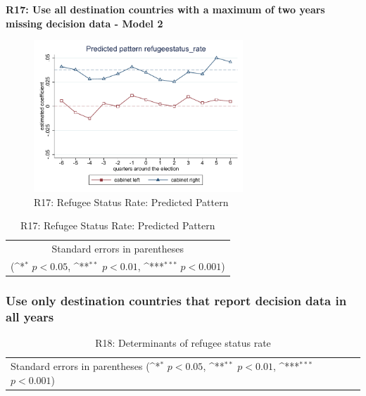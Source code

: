 \documentclass[10pt,a4paper]{scrartcl}
\begin{document}
\clearpage
\textbf{R17: Use all destination countries with a maximum of two years missing decision data - Model 2}
\begin{figure}[!ht]
	\centering
	\includegraphics[width=0.7\textwidth]{figures_edited/refugeestatus_rate_graph2_R17.pdf}
	\caption{R17: Refugee Status Rate: Predicted Pattern}
\end{figure}

\begin{table}[!ht]\centering
	\footnotesize
	\renewcommand{\arraystretch}{1.15}
	\def\sym#1{\ifmmode^{#1}\else\(^{#1}\)\fi}
	\caption{R17: Refugee Status Rate: Predicted Pattern}
	\begin{tabular}{l*{2}{c}}
		\hline\hline
		
		\hline\hline
		\multicolumn{3}{c}{\footnotesize Standard errors in parentheses} \\
		\multicolumn{3}{c}{\footnotesize (\sym{*} \(p<0.05\), \sym{**} \(p<0.01\), \sym{***} \(p<0.001\))} \\
	\end{tabular}
\end{table}





\clearpage
\FloatBarrier
\subsubsection{Use only destination countries that report decision data in all years}
\begin{table}[!ht]\centering
	\renewcommand{\arraystretch}{1.25}
	\small
	\def\sym#1{\ifmmode^{#1}\else\(^{#1}\)\fi}
	\caption{R18: Determinants of refugee status rate}
	\begin{tabular}{l*{3}{c}}
		\hline\hline
		
		\hline\hline
		\multicolumn{4}{l}{\footnotesize Standard errors in parentheses (\sym{*} \(p<0.05\), \sym{**} \(p<0.01\), \sym{***} \(p<0.001\))}\\
	\end{tabular}
\end{table}
\end{document}
